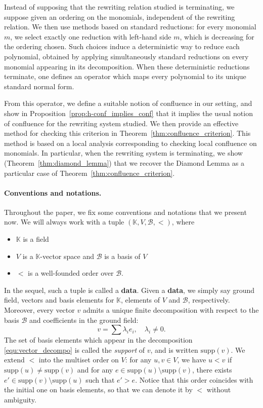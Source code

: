 \documentclass[10pt]{easychair}
\theoremstyle{definition}
\newcommand\data{{\color{red}\bf data}}
\newcommand\supp{\text{supp}}
\newcommand\basis{\mathscr{B}}
\newcommand\K{\mathbb{K}}
\begin{document}
Instead of supposing that the rewriting relation studied is
terminating, we suppose given an ordering on the monomials,
independent of the rewriting relation.  We then use methods based on
standard reductions: for every monomial $m$, we select exactly one
reduction with left-hand side $m$, which is decreasing for the
ordering chosen. Such choices induce a deterministic way to reduce
each polynomial, obtained by applying simultaneously standard
reductions on every monomial appearing in its decomposition. When
these deterministic reductions terminate, one defines an operator
which maps every polynomial to its unique standard normal form.

From this operator, we define a suitable notion of confluence in
our setting, and show in Proposition~\ref{prop:h-conf_implies_conf}
that it implies the usual notion of confluence for the rewriting
system studied. We then provide an effective method for checking this
criterion in Theorem~\ref{thm:confluence_criterion}. This method is
based on a local analysis corresponding to checking local confluence
on monomials. In particular, when the rewriting system is terminating,
we show (Theorem~\ref{thm:diamond_lemma}) that we recover the Diamond
Lemma as a particular case of Theorem~\ref{thm:confluence_criterion}.

\paragraph{Conventions and notations.}

Throughout the paper, we fix some conventions and notations that we
present now. We will always work with a tuple  $(\K,V,\basis,<)$, where
\begin{itemize}
\item $\K$ is a field
\item $V$ is a $\K$-vector space and $\basis$ is a basis of $V$
\item $<$ is a well-founded order over $\basis$.
\end{itemize}
In the sequel, such a tuple is called a \data. Given a \data, we simply
say ground field, vectors and basis elements for $\K$, elements of $V$
and $\basis$, respectively. Moreover, every vector $v$ admits a unique
finite decomposition with respect to the basis $\basis$ and coefficients
in the ground field:
\begin{equation}\label{equ:vector_decompo}
  v=\sum\lambda_ie_i,\quad\lambda_i\neq 0.
\end{equation}
The set of basis elements which appear in the decomposition
\eqref{equ:vector_decompo} is called the {\it support} of $v$, and is
written $\supp(v)$. We extend $<$ into the multiset order on $V$: for any
$u,v \in V$, we have $u<v$ if $\supp(u)\neq\supp(v)$ and for any
$e\in\supp(u)\setminus\supp(v)$, there exists
$e'\in\supp(v)\setminus\supp(u)$ such that $e'>e$. Notice that this order
coincides with the initial one on basis elements, so that we can denote
it by $<$ without ambiguity.
\medskip
\end{document}
